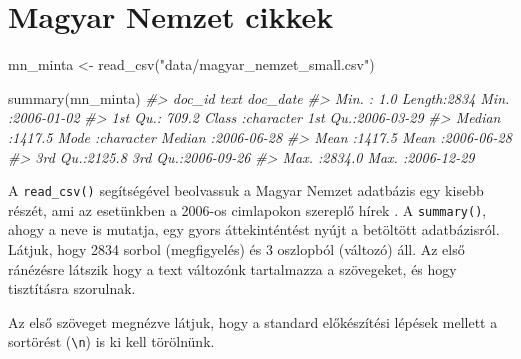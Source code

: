 \documentclass[
]{book}
\newenvironment{Shaded}{\begin{snugshade}}{\end{snugshade}}
\newcommand{\CommentTok}[1]{\textcolor[rgb]{0.56,0.35,0.01}{\textit{#1}}}
\newcommand{\DecValTok}[1]{\textcolor[rgb]{0.00,0.00,0.81}{#1}}
\newcommand{\FunctionTok}[1]{\textcolor[rgb]{0.00,0.00,0.00}{#1}}
\newcommand{\NormalTok}[1]{#1}
\newcommand{\OtherTok}[1]{\textcolor[rgb]{0.56,0.35,0.01}{#1}}
\newcommand{\SpecialCharTok}[1]{\textcolor[rgb]{0.00,0.00,0.00}{#1}}
\newcommand{\StringTok}[1]{\textcolor[rgb]{0.31,0.60,0.02}{#1}}
\begin{document}
\hypertarget{magyar-nemzet-cikkek}{%
\section{Magyar Nemzet cikkek}\label{magyar-nemzet-cikkek}}

\begin{Shaded}
\begin{Highlighting}[]
\NormalTok{mn\_minta }\OtherTok{\textless{}{-}} \FunctionTok{read\_csv}\NormalTok{(}\StringTok{"data/magyar\_nemzet\_small.csv"}\NormalTok{)}

\FunctionTok{summary}\NormalTok{(mn\_minta)}
\CommentTok{\#\textgreater{}      doc\_id           text              doc\_date         }
\CommentTok{\#\textgreater{}  Min.   :   1.0   Length:2834        Min.   :2006{-}01{-}02  }
\CommentTok{\#\textgreater{}  1st Qu.: 709.2   Class :character   1st Qu.:2006{-}03{-}29  }
\CommentTok{\#\textgreater{}  Median :1417.5   Mode  :character   Median :2006{-}06{-}28  }
\CommentTok{\#\textgreater{}  Mean   :1417.5                      Mean   :2006{-}06{-}28  }
\CommentTok{\#\textgreater{}  3rd Qu.:2125.8                      3rd Qu.:2006{-}09{-}26  }
\CommentTok{\#\textgreater{}  Max.   :2834.0                      Max.   :2006{-}12{-}29}
\end{Highlighting}
\end{Shaded}

A \texttt{read\_csv()} segítségével beolvassuk a Magyar Nemzet adatbázis
egy kisebb részét, ami az esetünkben a 2006-os cimlapokon szereplő hírek
. A \texttt{summary()}, ahogy a neve is mutatja, egy gyors
áttekinténtést nyújt a betöltött adatbázisról. Látjuk, hogy 2834 sorbol
(megfigyelés) és 3 oszlopból (változó) áll. Az első ránézésre látszik
hogy a text változónk tartalmazza a szövegeket, és hogy tisztításra
szorulnak.

Az első szöveget megnézve látjuk, hogy a standard előkészítési lépések
mellett a sortörést (\texttt{\textbackslash{}n}) is ki kell törölnünk.

\begin{Shaded}
\end{Shaded}
\end{document}
